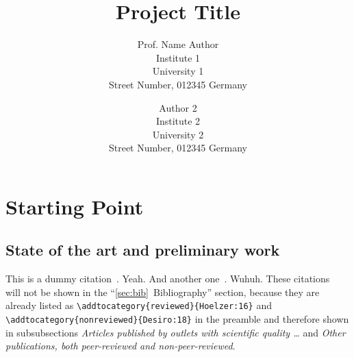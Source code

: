 \documentclass[ngerman,firsttime]{dfgproposal}
\title{Project Title}
\author[%
	Prof. Name Author\\
	Institute 1, University 1 (Abbr)
	\and
	Author 2\\
	Institute 2, University 2 (Abbr2)
]{Prof. Name Author\\
	Institute 1\\University 1\\Street Number, 012345 Germany
	\and
	Author 2\\
	Institute 2\\University 2\\Street Number, 012345 Germany
}
\begin{document}
	\maketitle
	
	
	
	\section{Starting Point}
	\label{sec:work-report}
	
	\subsection{State of the art and preliminary work}
	
	This is a dummy citation~\cite{Hoelzer:17}. Yeah. And another
	one~\cite{Gerst:18}. Wuhuh. These citations~\cite{Hoelzer:16, Desiro:18} will
	not be shown in the \enquote{\ref{sec:bib}~Bibliography} section, because they are
	already listed as \verb=\addtocategory{reviewed}{Hoelzer:16}= and
	\verb=\addtocategory{nonreviewed}{Desiro:18}= in the preamble and therefore
	shown in subsubsections \emph{Articles published by outlets with scientific
		quality \dots} and \emph{Other publications, both peer-reviewed and non-peer-reviewed}. 
	
\end{document}
